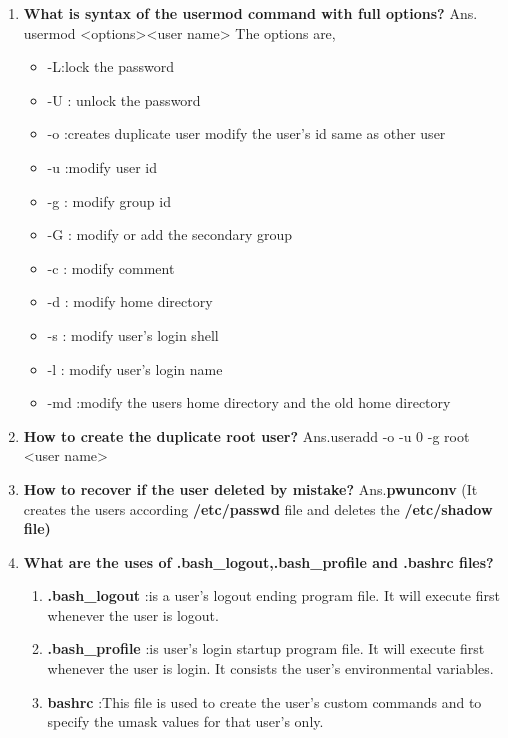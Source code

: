 \begin{enumerate}
    \item\textbf{What is syntax of the usermod command with full options?}
    \newline
    Ans. usermod   <options><user name>
        The options are,        \begin{itemize}
                                  \item  -L:lock the password
                                  \item -U : unlock the password
                                  \item -o :creates duplicate user modify the user's  id  same as other user
                                  \item -u :modify user id
                                  \item -g : modify group id
                                  \item -G : modify   or  add  the  secondary group
                                  \item -c : modify comment
                                  \item -d : modify home directory
                                  \item -s : modify user's login shell
                                  \item -l : modify user's login name
                                  \item -md :modify the users home directory and the old home directory 
                                \end{itemize}
    \bigskip
    \bigskip

    \item\textbf{How to create the duplicate root user?}
    \newline
    Ans.useradd   -o   -u   0   -g   root    <user name>

    \bigskip
    \bigskip

    \item\textbf{How to recover if the user deleted by mistake?}
    \newline
    Ans.\textbf{pwunconv}	(It creates the users according  \textbf{/etc/passwd}  file and deletes the  \textbf{/etc/shadow   file)}

    \bigskip
    \bigskip
     
    \item\textbf{What are the uses of  .bash\_logout,.bash\_profile and .bashrc   files?}
    \newline
      \begin{enumerate}
        Ans.\item\textbf{.bash\_logout} :is a user's logout ending program file. It will execute first whenever the user is logout.
        \item\textbf{.bash_profile} :is user's login startup program file. It will execute first whenever the user is login. It consists 	 the user's environmental variables. 
        \item\textbf{bashrc} :This file is used to create the user's custom commands and to specify the umask values for that user's  only.
       \end{enumerate}


\end{enumerate}
